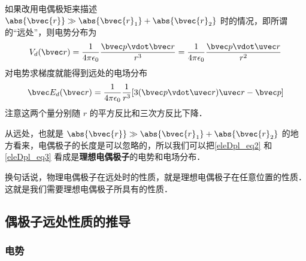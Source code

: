 如果改用电偶极矩来描述 $\abs{\bvec{r}}\gg\\\abs{\bvec{r}_1}+\abs{\bvec{r}_2}$ 时的情况，即所谓的“远处”，则电势分布为
\begin{equation}\label{eleDpl_eq2}
V_d(\bvec r) = \frac{1}{4\pi\epsilon_0} \frac{\bvec p\vdot \bvec r}{r^3} = \frac{1}{4\pi\epsilon_0} \frac{\bvec p \vdot \uvec r}{r^2}
\end{equation}
对电势求梯度就能得到远处的电场分布
\begin{equation}\label{eleDpl_eq3}
\bvec E_d(\bvec r) = \frac{1}{4\pi\epsilon_0} \frac{1}{r^3} [3(\bvec p \vdot \uvec r) \uvec r - \bvec p]
\end{equation}
注意这两个量分别随 $r$ 的平方反比和三次方反比下降．

从远处，也就是 $\abs{\bvec{r}}\gg\\\abs{\bvec{r}_1}+\abs{\bvec{r}_2}$ 的地方看来，电偶极子的长度是可以忽略的，所以我们可以把\autoref{eleDpl_eq2} 和\autoref{eleDpl_eq3} 看成是\textbf{理想电偶极子}的电势和电场分布．

换句话说，物理电偶极子在远处时的性质，就是理想电偶极子在任意位置的性质．这就是我们需要理想电偶极子所具有的性质．



\subsection{偶极子远处性质的推导}

\subsubsection{电势}

